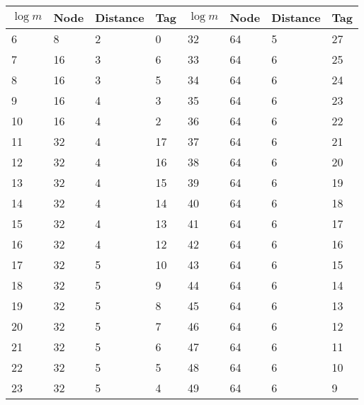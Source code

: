 \begin{table}
    \centering\begin{tabular}{llll|llll}
                  $\log m$ & Node & Distance & Tag & $\log m$ & Node & Distance & Tag \\
                  \hline
                  6        & 8    & 2        & 0   & 32       & 64   & 5        & 27  \\
                  7        & 16   & 3        & 6   & 33       & 64   & 6        & 25  \\
                  8        & 16   & 3        & 5   & 34       & 64   & 6        & 24  \\
                  9        & 16   & 4        & 3   & 35       & 64   & 6        & 23  \\
                  10       & 16   & 4        & 2   & 36       & 64   & 6        & 22  \\
                  11       & 32   & 4        & 17  & 37       & 64   & 6        & 21  \\
                  12       & 32   & 4        & 16  & 38       & 64   & 6        & 20  \\
                  13       & 32   & 4        & 15  & 39       & 64   & 6        & 19  \\
                  14       & 32   & 4        & 14  & 40       & 64   & 6        & 18  \\
                  15       & 32   & 4        & 13  & 41       & 64   & 6        & 17  \\
                  16       & 32   & 4        & 12  & 42       & 64   & 6        & 16  \\
                  17       & 32   & 5        & 10  & 43       & 64   & 6        & 15  \\
                  18       & 32   & 5        & 9   & 44       & 64   & 6        & 14  \\
                  19       & 32   & 5        & 8   & 45       & 64   & 6        & 13  \\
                  20       & 32   & 5        & 7   & 46       & 64   & 6        & 12  \\
                  21       & 32   & 5        & 6   & 47       & 64   & 6        & 11  \\
                  22       & 32   & 5        & 5   & 48       & 64   & 6        & 10  \\
                  23       & 32   & 5        & 4   & 49       & 64   & 6        & 9   \\

\end{tabular}
\end{table}
